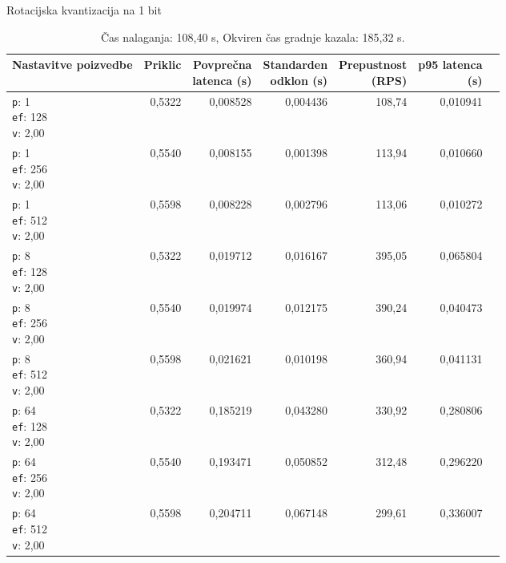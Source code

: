 \begin{table}[htbp]
  \centering
\small
  \caption{Rotacijska kvantizacija na 1 bit}
  \label{tab:single-2cpu-4ram:tq1-2:qdrant-dipl-baseline-tenant-subgraph-tq1-m16-ef-128-random-768-100-tenants-extended-upload-2026-08-18-08-12-28.json}
  \begin{tabularx}{\textwidth}{Xrrrrrr}
    \toprule
    Nastavitve poizvedbe & Priklic & \makecell{Povprečna\\latenca (s)} & \makecell{Standarden\\odklon (s)} & \makecell{Prepustnost\\(RPS)} & \makecell{p95 latenca\\(s)}  \\
    \midrule
    \makecell{\texttt{p}: 1\\\texttt{ef}: 128\\\texttt{v}: 2,00} & 0,5322 & 0,008528 & 0,004436 & 108,74 & 0,010941 \\
    \makecell{\texttt{p}: 1\\\texttt{ef}: 256\\\texttt{v}: 2,00} & 0,5540 & 0,008155 & 0,001398 & 113,94 & 0,010660 \\
    \makecell{\texttt{p}: 1\\\texttt{ef}: 512\\\texttt{v}: 2,00} & 0,5598 & 0,008228 & 0,002796 & 113,06 & 0,010272 \\
    \makecell{\texttt{p}: 8\\\texttt{ef}: 128\\\texttt{v}: 2,00} & 0,5322 & 0,019712 & 0,016167 & 395,05 & 0,065804 \\
    \makecell{\texttt{p}: 8\\\texttt{ef}: 256\\\texttt{v}: 2,00} & 0,5540 & 0,019974 & 0,012175 & 390,24 & 0,040473 \\
    \makecell{\texttt{p}: 8\\\texttt{ef}: 512\\\texttt{v}: 2,00} & 0,5598 & 0,021621 & 0,010198 & 360,94 & 0,041131 \\
    \makecell{\texttt{p}: 64\\\texttt{ef}: 128\\\texttt{v}: 2,00} & 0,5322 & 0,185219 & 0,043280 & 330,92 & 0,280806 \\
    \makecell{\texttt{p}: 64\\\texttt{ef}: 256\\\texttt{v}: 2,00} & 0,5540 & 0,193471 & 0,050852 & 312,48 & 0,296220 \\
    \makecell{\texttt{p}: 64\\\texttt{ef}: 512\\\texttt{v}: 2,00} & 0,5598 & 0,204711 & 0,067148 & 299,61 & 0,336007 \\
    \bottomrule
  \end{tabularx}
\caption* {Čas nalaganja: 108,40 s, Okviren čas gradnje kazala: 185,32 s.}\end{table}

